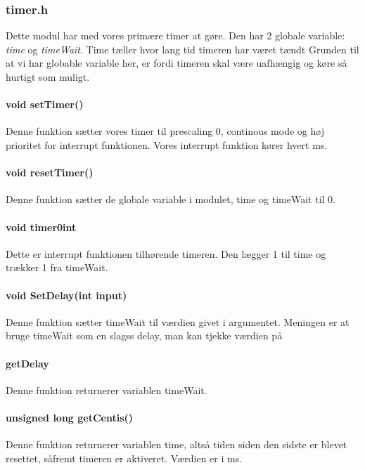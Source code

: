 \subsubsection{timer.h}
Dette modul har med vores primære timer at gøre. Den har 2 globale variable: \textit{time} og \textit{timeWait}. Time tæller hvor lang tid timeren har været tændt Grunden til at vi har globable variable her, er fordi timeren skal være uafhængig og køre så hurtigt som muligt.
\paragraph{void setTimer()}
Denne funktion sætter vores timer til prescaling 0, continous mode og høj prioritet for interrupt funktionen. Vores interrupt funktion kører hvert ms.
\paragraph{void resetTimer()}
Denne funktion sætter de globale variable i modulet, time og timeWait til 0.
\paragraph{void timer0int}
Dette er interrupt funktionen tilhørende timeren. Den lægger 1 til time og trækker 1 fra timeWait. 
\paragraph{void SetDelay(int input)}
Denne funktion sætter timeWait til værdien givet i argumentet. Meningen er at bruge timeWait som en slagss delay, man kan tjekke værdien på
\paragraph{getDelay}
Denne funktion returnerer variablen timeWait.
\paragraph{unsigned long getCentis()}
Denne funktion returnerer variablen time, altså tiden siden den sidste er blevet resettet, såfremt timeren er aktiveret. Værdien er i ms.

